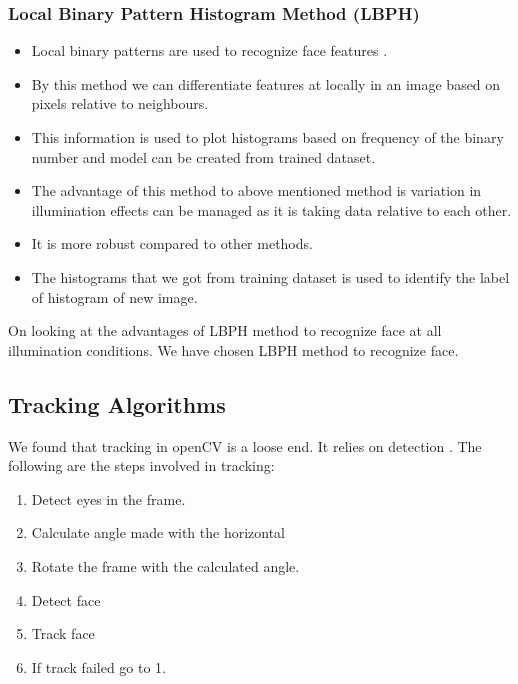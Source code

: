 \documentclass[conference]{IEEEtran}
\begin{document}
\subsubsection{Local Binary Pattern Histogram Method (LBPH)}
\begin{itemize}
	\item Local binary patterns are used to recognize face features \cite{facerec}.
	\item By this method we can differentiate features at locally in an image based on pixels relative to neighbours. 
	\item This information is used to plot histograms based on frequency of the binary number and model can  be created from trained dataset. 
	\item The advantage of this method to above mentioned method is variation in illumination effects can be managed as it is taking data relative to each other. 
	\item It is more robust compared to other methods. 
	\item The histograms that we got from training dataset is used to identify the label of histogram of new image.
\end{itemize}
 On looking at the advantages of LBPH method to recognize face at all illumination conditions. We have chosen LBPH method to recognize face.

\subsection{Tracking Algorithms}

We found that tracking in openCV is a loose end. It relies on detection \cite{facetrack}. The following are the steps involved in tracking:
\begin{enumerate}
	\item Detect eyes in the frame.
	\item Calculate angle made with the horizontal
	\item Rotate the frame with the calculated angle.
	\item Detect face
	\item Track face
	\item If track failed go to 1.
\end{enumerate}
\end{document}
